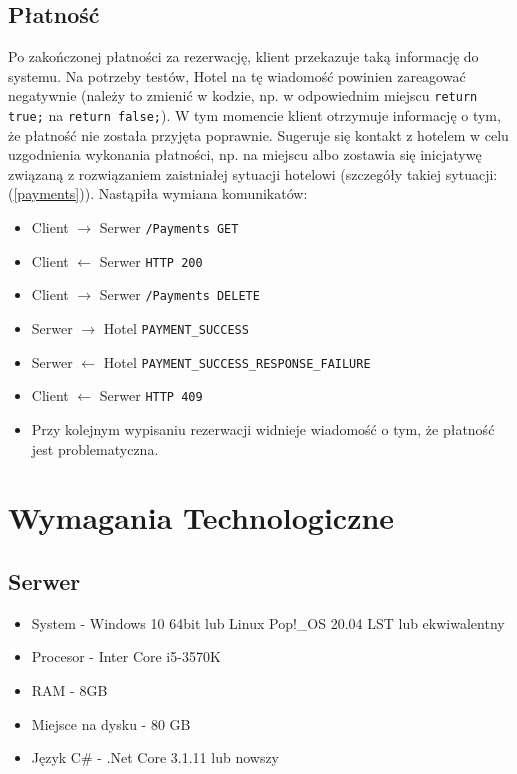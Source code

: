\documentclass{article}
\begin{document}
\subsection{Płatność}
Po zakończonej płatności za rezerwację, klient przekazuje taką informację do systemu. Na potrzeby testów, Hotel na tę wiadomość powinien zareagować negatywnie (należy to zmienić w kodzie, np. w odpowiednim miejscu \texttt{return true;} na \texttt{return false;}). W tym momencie klient otrzymuje informację o tym, że płatność nie została przyjęta poprawnie. Sugeruje się kontakt z hotelem w celu uzgodnienia wykonania płatności, np. na miejscu albo zostawia się inicjatywę związaną z rozwiązaniem zaistniałej sytuacji hotelowi (szczegóły takiej sytuacji: (\ref{payments})). Nastąpiła wymiana komunikatów:
\begin{itemize}
    \item Client $\rightarrow$ Serwer \texttt{/Payments GET}
    \item Client $\leftarrow$ Serwer \texttt{HTTP 200}
    \item Client $\rightarrow$ Serwer \texttt{/Payments DELETE}
    \item Serwer $\rightarrow$ Hotel \texttt{PAYMENT\_SUCCESS}
    \item Serwer $\leftarrow$ Hotel \texttt{PAYMENT\_SUCCESS\_RESPONSE\_FAILURE}
    \item Client $\leftarrow$ Serwer \texttt{HTTP 409}
    \item Przy kolejnym wypisaniu rezerwacji widnieje wiadomość o tym, że płatność jest problematyczna.
\end{itemize}

\section{Wymagania Technologiczne}
\subsection{Serwer}
\begin{itemize}
    \item System - Windows 10 64bit lub Linux Pop!\_OS 20.04 LST lub ekwiwalentny
    \item Procesor - Inter Core i5-3570K
    \item RAM - 8GB
    \item Miejsce na dysku - 80 GB
    \item Język C\# - .Net Core 3.1.11 lub nowszy
\end{itemize}
\end{document}
